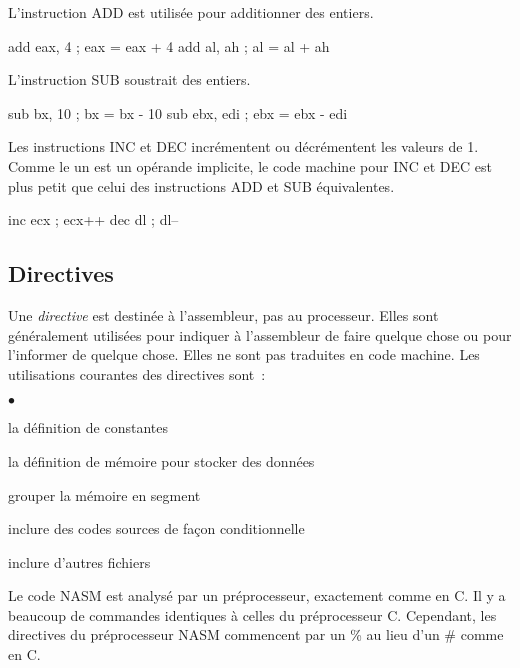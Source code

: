 L'instruction {\code ADD} est utilisée pour additionner des entiers.
\begin{AsmCodeListing}[frame=none, numbers=none]
      add    eax, 4   ; eax = eax + 4
      add    al, ah   ; al = al + ah 
\end{AsmCodeListing}

L'instruction {\code SUB} soustrait des entiers.
\begin{AsmCodeListing}[frame=none, numbers=none]
      sub    bx, 10   ; bx = bx - 10
      sub    ebx, edi ; ebx = ebx - edi
\end{AsmCodeListing}

Les instructions {\code INC}  et {\code DEC}  incrémentent ou décrémentent les valeurs de 1.
Comme le un est un opérande implicite, le code machine pour {\code INC} et {\code DEC} est
plus petit que celui des instructions {\code ADD} et {\code SUB} équivalentes.
\begin{AsmCodeListing}[frame=none, numbers=none]
      inc    ecx      ; ecx++
      dec    dl       ; dl--
\end{AsmCodeListing}

\subsection{Directives}

Une \emph{directive} est destinée à l'assembleur, pas au processeur. Elles sont généralement
utilisées pour indiquer à l'assembleur de faire quelque chose ou pour l'informer de quelque chose.
Elles ne sont pas traduites en code machine. Les utilisations courantes des directives sont~:
\begin{list}{$\bullet$}{\setlength{\itemsep}{0pt}}
\item la définition de constantes
\item la définition de mémoire pour stocker des données
\item grouper la mémoire en segment
\item inclure des codes sources de façon conditionnelle
\item inclure d'autres fichiers
\end{list}

Le code NASM est analysé par un préprocesseur, exactement comme en C. Il y a beaucoup
de commandes identiques à celles du préprocesseur C. Cependant, les directives du préprocesseur
NASM commencent par un \% au lieu d'un \# comme en C.

